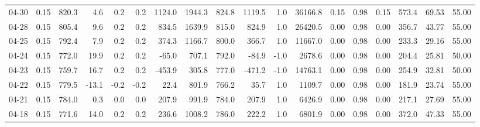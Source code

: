 \begin{threeparttable}
{\begin{tabular}{lrrrrrrrrrrrrrrrrr}
  04-30 &     0.15 & 820.3 &               4.6 &               0.2 &                0.2 &             1124.0 &  1944.3 & 824.8 &     1119.5 &                      1.0 &             36166.8 &       0.15 &      0.98 &           0.15 &            573.4 &           69.53 &                  55.00 \\
  04-28 &     0.15 & 805.4 &               9.6 &               0.2 &                0.2 &              834.5 &  1639.9 & 815.0 &      824.9 &                      1.0 &             26420.5 &       0.00 &      0.98 &           0.00 &            356.7 &           43.77 &                  55.00 \\
  04-25 &     0.15 & 792.4 &               7.9 &               0.2 &                0.2 &              374.3 &  1166.7 & 800.0 &      366.7 &                      1.0 &             11667.0 &       0.00 &      0.98 &           0.00 &            233.3 &           29.16 &                  55.00 \\
  04-24 &     0.15 & 772.0 &              19.9 &               0.2 &                0.2 &              -65.0 &   707.1 & 792.0 &      -84.9 &                     -1.0 &              2678.6 &       0.00 &      0.98 &           0.00 &            204.4 &           25.81 &                  50.00 \\
  04-23 &     0.15 & 759.7 &              16.7 &               0.2 &                0.2 &             -453.9 &   305.8 & 777.0 &     -471.2 &                     -1.0 &             14763.1 &       0.00 &      0.98 &           0.00 &            254.9 &           32.81 &                  50.00 \\
  04-22 &     0.15 & 779.5 &             -13.1 &              -0.2 &               -0.2 &               22.4 &   801.9 & 766.2 &       35.7 &                      1.0 &              1109.7 &       0.00 &      0.98 &           0.00 &            181.9 &           23.74 &                  55.00 \\
  04-21 &     0.15 & 784.0 &               0.3 &               0.0 &                0.0 &              207.9 &   991.9 & 784.0 &      207.9 &                      1.0 &              6426.9 &       0.00 &      0.98 &           0.00 &            217.1 &           27.69 &                  55.00 \\
  04-18 &     0.15 & 771.6 &              14.0 &               0.2 &                0.2 &              236.6 &  1008.2 & 786.0 &      222.2 &                      1.0 &              6801.9 &       0.00 &      0.98 &           0.00 &            372.0 &           47.33 &                  55.00 \\

\end{tabular}}
\end{threeparttable}
